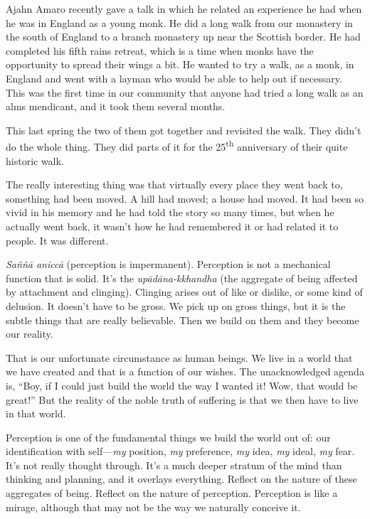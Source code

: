 Ajahn Amaro recently gave a talk in which he related an experience he
had when he was in England as a young monk. He did a long walk from our
monastery in the south of England to a branch monastery up near the
Scottish border. He had completed his fifth rains retreat, which is a
time when monks have the opportunity to spread their wings a bit. He
wanted to try a walk, as a monk, in England and went with a layman who
would be able to help out if necessary. This was the first time in our
community that anyone had tried a long walk as an alms mendicant, and it
took them several months.

This last spring the two of them got together and revisited the walk.
They didn’t do the whole thing. They did parts of it for the
25\textsuperscript{th} anniversary of their quite historic walk.

The really interesting thing was that virtually every place they went
back to, something had been moved. A hill had moved; a house had moved.
It had been so vivid in his memory and he had told the story so many
times, but when he actually went back, it wasn’t how he had remembered
it or had related it to people. It was different.

\emph{Saññā aniccā} (perception is impermanent). Perception is not a
mechanical function that is solid. It’s the \emph{upādāna-kkhandha} (the
aggregate of being affected by attachment and clinging). Clinging arises
out of like or dislike, or some kind of delusion. It doesn’t have to be
gross. We pick up on gross things, but it is the subtle things that are
really believable. Then we build on them and they become our reality.

That is our unfortunate circumstance as human beings. We live in a world
that we have created and that is a function of our wishes. The
unacknowledged agenda is, “Boy, if I could just build the world the way
I wanted it! Wow, that would be great!” But the reality of the noble
truth of suffering is that we then have to live in that world.

Perception is one of the fundamental things we build the world out of:
our identification with self—\emph{my} position, \emph{my} preference,
\emph{my} idea, \emph{my} ideal, \emph{my} fear. It’s not really thought
through. It’s a much deeper stratum of the mind than thinking and
planning, and it overlays everything. Reflect on the nature of these
aggregates of being. Reflect on the nature of perception. Perception is
like a mirage, although that may not be the way we naturally conceive
it.

